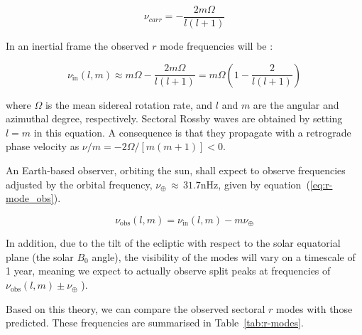 \begin{equation}
\nu_{carr} = - \frac{2m\Omega}{l(l + 1)}
\label{eq:dispersion_rel}
\end{equation}

In an inertial frame the observed $r$ mode frequencies will be \citep{lanza_sectoral_2019}:

\begin{equation}
\nu_{\mathrm{in}}(l,m) \approx m\Omega - \frac{2m\Omega}{l(l + 1)}  = m\Omega \left(1 - \frac{2}{l(l + 1)}\right)
\label{eq:r-mode}
\end{equation}

where $\Omega$ is the mean sidereal rotation rate, and $l$ and $m$ are the angular and azimuthal degree, respectively. Sectoral Rossby waves are obtained by setting $l=m$ in this equation. A consequence is that they propagate with a retrograde phase velocity as $\nu / m = -2 \Omega/[m(m + 1)] < 0$.

An Earth-based observer, orbiting the sun, shall expect to observe frequencies adjusted by the orbital frequency, $\nu_\oplus \, \approx \, 31.7$nHz, given by equation~(\ref{eq:r-mode_obs}).

\begin{equation}
\nu_{\mathrm{obs}}(l,m) = \nu_{\mathrm{in}}(l,m) - m\nu_{\oplus}
\label{eq:r-mode_obs}
\end{equation}

In addition, due to the tilt of the ecliptic with respect to the solar equatorial plane (the solar $B_0$ angle), the visibility of the modes will vary on a timescale of 1 year, meaning we expect to actually observe split peaks at frequencies of $\nu_{\mathrm{obs}}(l,m) \pm \nu_{\oplus}$ \citep{lanza_sectoral_2019}).

Based on this theory, we can compare the observed sectoral $r$ modes with those predicted. These frequencies are summarised in Table~\ref{tab:r-modes}.


